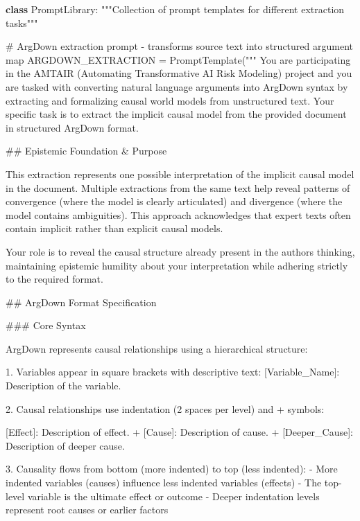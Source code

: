 \documentclass[
  11pt,
  letterpaper,
]{book}
\newenvironment{Shaded}{\begin{snugshade}}{\end{snugshade}}
\newcommand{\CommentTok}[1]{\textcolor[rgb]{0.37,0.37,0.37}{#1}}
\newcommand{\KeywordTok}[1]{\textcolor[rgb]{0.00,0.23,0.31}{\textbf{#1}}}
\newcommand{\NormalTok}[1]{\textcolor[rgb]{0.00,0.23,0.31}{#1}}
\newcommand{\OperatorTok}[1]{\textcolor[rgb]{0.37,0.37,0.37}{#1}}
\newcommand{\StringTok}[1]{\textcolor[rgb]{0.13,0.47,0.30}{#1}}
\begin{document}
\begin{Shaded}
\begin{Highlighting}[]
\KeywordTok{class}\NormalTok{ PromptLibrary:}
    \CommentTok{"""Collection of prompt templates for different extraction tasks"""}

    \CommentTok{\# ArgDown extraction prompt {-} transforms source text into structured argument map}
\NormalTok{    ARGDOWN\_EXTRACTION }\OperatorTok{=}\NormalTok{ PromptTemplate(}\StringTok{"""}
\StringTok{You are participating in the AMTAIR (Automating Transformative AI Risk Modeling)}
\StringTok{project and you are tasked with converting natural language arguments into}
\StringTok{ArgDown syntax by extracting and formalizing causal world models from}
\StringTok{unstructured text.}
\StringTok{Your specific task is to extract the implicit causal model from the provided}
\StringTok{document in structured ArgDown format.}

\StringTok{\#\# Epistemic Foundation \& Purpose}

\StringTok{This extraction represents one possible interpretation of the implicit causal}
\StringTok{model in the document. Multiple extractions from the same text help reveal}
\StringTok{patterns of convergence (where the model is clearly articulated) and}
\StringTok{divergence (where the model contains ambiguities). This approach acknowledges}
\StringTok{that expert texts often contain implicit rather than explicit causal models.}

\StringTok{Your role is to reveal the causal structure already present in the author\textquotesingle{}s}
\StringTok{thinking, maintaining epistemic humility about your interpretation while}
\StringTok{adhering strictly to the required format.}

\StringTok{\#\# ArgDown Format Specification}

\StringTok{\#\#\# Core Syntax}

\StringTok{ArgDown represents causal relationships using a hierarchical structure:}

\StringTok{1. Variables appear in square brackets with descriptive text:}
\StringTok{   \textasciigrave{}[Variable\_Name]: Description of the variable.\textasciigrave{}}

\StringTok{2. Causal relationships use indentation (2 spaces per level) and \textquotesingle{}+\textquotesingle{} symbols:}

\StringTok{[Effect]: Description of effect. + [Cause]: Description of cause. + [Deeper\_Cause]: Description of deeper cause.}

\StringTok{3. Causality flows from bottom (more indented) to top (less indented):}
\StringTok{{-} More indented variables (causes) influence less indented variables (effects)}
\StringTok{{-} The top{-}level variable is the ultimate effect or outcome}
\StringTok{{-} Deeper indentation levels represent root causes or earlier factors}


\end{Highlighting}
\end{Shaded}
\end{document}
